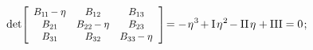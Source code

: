 \begin{otherlanguage}{russian}
\nopagebreak\vspace{-0.1em}\begin{equation}\label{chardetequation}
\operatorname{det} \hspace{-0.4ex} \scalebox{0.9}[0.92]{$\left[
\begin{array}{ccc}
B_{1\hspace{-0.12ex}1} \hspace{-0.16ex} - \eigenvalue & B_{12} & B_{13} \\
B_{21} & B_{22} \hspace{-0.16ex} - \eigenvalue & B_{23} \\
B_{31} & B_{32} & B_{33} \hspace{-0.16ex} - \eigenvalue
\end{array}
\hspace{.1ex}\right]$} \hspace{-0.4ex} = - \hspace{.2ex} \eigenvalue^3 \hspace{-0.25ex} + \mathrm{I}\hspace{.25ex} \eigenvalue^2 \hspace{-0.25ex} - \mathrm{II}\hspace{.25ex} \eigenvalue + \mathrm{III} = 0 \hspace{.2ex} ;
\end{equation}


\end{otherlanguage}
